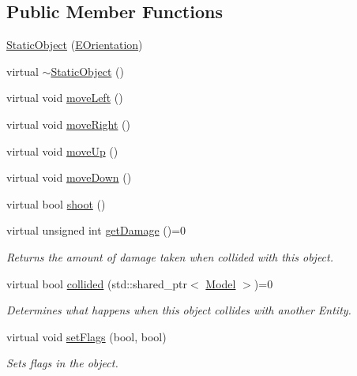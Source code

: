 \subsection*{\-Public \-Member \-Functions}
\begin{DoxyCompactItemize}
\item 
\hyperlink{classmodels_1_1StaticObject_a6906ebe9fe1515063a52e7f4634efc12}{\-Static\-Object} (\hyperlink{namespacemodels_adec64ede5178a8b8fed882b3790d423d}{\-E\-Orientation})
\item 
virtual \hyperlink{classmodels_1_1StaticObject_a76a08cf45b5db6bbb3743e9922ab42e6}{$\sim$\-Static\-Object} ()
\item 
virtual void \hyperlink{classmodels_1_1StaticObject_ab65a9e6a413fd913a62c612d6aab31f6}{move\-Left} ()
\item 
virtual void \hyperlink{classmodels_1_1StaticObject_aae350f824f62b97d9f925fb6a0f12d34}{move\-Right} ()
\item 
virtual void \hyperlink{classmodels_1_1StaticObject_ab2a4c782bde30f8afc34aad64692728a}{move\-Up} ()
\item 
virtual void \hyperlink{classmodels_1_1StaticObject_a7968700aa9bc166e5940b9e6fd816966}{move\-Down} ()
\item 
virtual bool \hyperlink{classmodels_1_1StaticObject_aed475f7fdbef72b9c6763cd1d530da37}{shoot} ()
\item 
virtual unsigned int \hyperlink{classmodels_1_1StaticObject_a216b997d3c40a76d0bb69c1863202272}{get\-Damage} ()=0
\begin{DoxyCompactList}\small\item\em \-Returns the amount of damage taken when collided with this object. \end{DoxyCompactList}\item 
virtual bool \hyperlink{classmodels_1_1StaticObject_ab75af94c0785c0e6dddbd2006078c136}{collided} (std\-::shared\-\_\-ptr$<$ \hyperlink{classmodels_1_1Model}{\-Model} $>$)=0
\begin{DoxyCompactList}\small\item\em \-Determines what happens when this object collides with another \-Entity. \end{DoxyCompactList}\item 
virtual void \hyperlink{classmodels_1_1StaticObject_a822eec0669be0374e03d5183d24d13c9}{set\-Flags} (bool, bool)
\begin{DoxyCompactList}\small\item\em \-Sets flags in the object. \end{DoxyCompactList}\end{DoxyCompactItemize}


